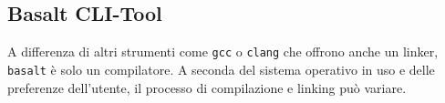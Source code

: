 
\subsection{Basalt CLI-Tool}
A differenza di altri strumenti come \texttt{gcc} o \texttt{clang} che offrono
anche un linker, \texttt{basalt} è solo un compilatore. A seconda 
del sistema operativo in uso e delle preferenze dell'utente,
il processo di compilazione e linking può variare.





